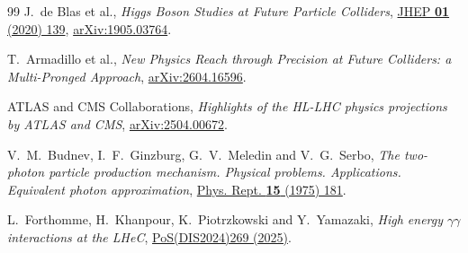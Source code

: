\begin{thebibliography}{99}
J.~de Blas et al., \emph{Higgs Boson Studies at Future Particle Colliders},
\href{https://doi.org/10.1007/JHEP01(2020)139}{JHEP \textbf{01} (2020) 139},
\href{https://arxiv.org/abs/1905.03764}{arXiv:1905.03764}.




T.~Armadillo et al., \emph{New Physics Reach through Precision at Future Colliders: a Multi-Pronged Approach},
\href{https://arxiv.org/abs/2604.16596}{arXiv:2604.16596}.



ATLAS and CMS Collaborations, \emph{Highlights of the HL-LHC physics projections by ATLAS and CMS},
\href{https://arxiv.org/abs/2504.00672}{arXiv:2504.00672}.



V.~M.~Budnev, I.~F.~Ginzburg, G.~V.~Meledin and V.~G.~Serbo,
\emph{The two-photon particle production mechanism. Physical problems. Applications. Equivalent photon approximation},
\href{https://doi.org/10.1016/0370-1573(75)90009-5}{Phys. Rept. \textbf{15} (1975) 181}.



L.~Forthomme, H.~Khanpour, K.~Piotrzkowski and Y.~Yamazaki,
\emph{High energy $\gamma\gamma$ interactions at the LHeC},
\href{https://doi.org/10.22323/1.469.0269}{PoS(DIS2024)269 (2025)}.



\end{thebibliography}
